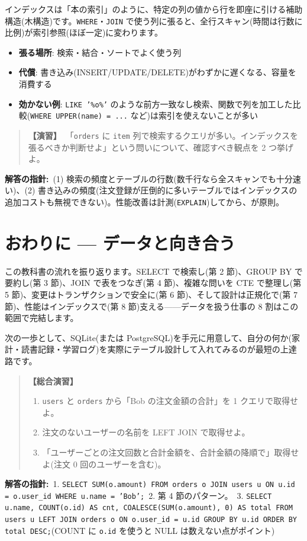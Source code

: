 \documentclass{article}
\begin{document}
インデックスは「本の索引」のように、特定の列の値から行を即座に引ける補助構造(木構造)です。\texttt{WHERE}・\texttt{JOIN} で使う列に張ると、全行スキャン(時間は行数に比例)が索引参照(ほぼ一定)に変わります。

\begin{itemize}
\item \textbf{張る場所}: 検索・結合・ソートでよく使う列
\item \textbf{代償}: 書き込み(INSERT/UPDATE/DELETE)がわずかに遅くなる、容量を消費する
\item \textbf{効かない例}: \texttt{LIKE '\%o\%'} のような前方一致なし検索、関数で列を加工した比較(\texttt{WHERE UPPER(name) = ...} など)は索引を使えないことが多い
\end{itemize}

\begin{quote}
\textbf{【演習】}\ 「\texttt{orders} に \texttt{item} 列で検索するクエリが多い。インデックスを張るべきか判断せよ」という問いについて、確認すべき観点を 2 つ挙げよ。
\end{quote}

\textbf{解答の指針:}\ (1) 検索の頻度とテーブルの行数(数千行なら全スキャンでも十分速い)、(2) 書き込みの頻度(注文登録が圧倒的に多いテーブルではインデックスの追加コストも無視できない)。性能改善は計測(\texttt{EXPLAIN})してから、が原則。

\section{おわりに — データと向き合う}

この教科書の流れを振り返ります。SELECT で検索し(第 2 節)、GROUP BY で要約し(第 3 節)、JOIN で表をつなぎ(第 4 節)、複雑な問いを CTE で整理し(第 5 節)、変更はトランザクションで安全に(第 6 節)、そして設計は正規化で(第 7 節)、性能はインデックスで(第 8 節)支える——データを扱う仕事の 8 割はこの範囲で完結します。

次の一歩として、SQLite(または PostgreSQL)を手元に用意して、自分の何か(家計・読書記録・学習ログ)を実際にテーブル設計して入れてみるのが最短の上達路です。

\begin{quote}
\textbf{【総合演習】}
\begin{enumerate}
\item \texttt{users} と \texttt{orders} から「Bob の注文金額の合計」を 1 クエリで取得せよ。
\item 注文のないユーザーの名前を LEFT JOIN で取得せよ。
\item 「ユーザーごとの注文回数と合計金額を、合計金額の降順で」取得せよ(注文 0 回のユーザーを含む)。
\end{enumerate}
\end{quote}

\textbf{解答の指針:}\ 1. \texttt{SELECT SUM(o.amount) FROM orders o JOIN users u ON u.id = o.user\_id WHERE u.name = 'Bob';}\ 2. 第 4 節のパターン。\ 3. \texttt{SELECT u.name, COUNT(o.id) AS cnt, COALESCE(SUM(o.amount), 0) AS total FROM users u LEFT JOIN orders o ON o.user\_id = u.id GROUP BY u.id ORDER BY total DESC;}(COUNT に \texttt{o.id} を使うと NULL は数えない点がポイント)
\end{document}
